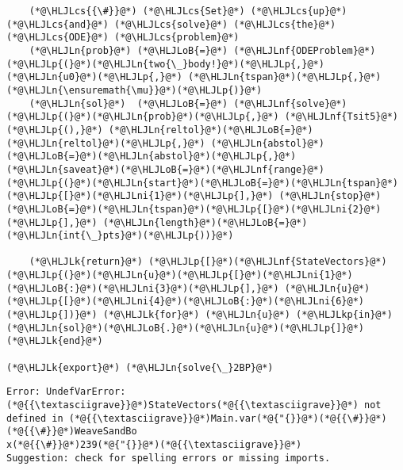 \documentclass[12pt,a4paper]{article}
\newcommand{\HLJLk}[1]{\textcolor[RGB]{148,91,176}{\textbf{#1}}}
\newcommand{\HLJLkp}[1]{\textcolor[RGB]{148,91,176}{\textbf{#1}}}
\newcommand{\HLJLn}[1]{#1}
\newcommand{\HLJLnf}[1]{\textcolor[RGB]{66,102,213}{#1}}
\newcommand{\HLJLni}[1]{\textcolor[RGB]{59,151,46}{#1}}
\newcommand{\HLJLoB}[1]{\textcolor[RGB]{102,102,102}{\textbf{#1}}}
\newcommand{\HLJLp}[1]{#1}
\newcommand{\HLJLcs}[1]{\textcolor[RGB]{153,153,119}{\textit{#1}}}
\begin{document}
\begin{lstlisting}
	(*@\HLJLcs{{\#}}@*) (*@\HLJLcs{Set}@*) (*@\HLJLcs{up}@*) (*@\HLJLcs{and}@*) (*@\HLJLcs{solve}@*) (*@\HLJLcs{the}@*) (*@\HLJLcs{ODE}@*) (*@\HLJLcs{problem}@*)
	(*@\HLJLn{prob}@*) (*@\HLJLoB{=}@*) (*@\HLJLnf{ODEProblem}@*)(*@\HLJLp{(}@*)(*@\HLJLn{two{\_}body!}@*)(*@\HLJLp{,}@*) (*@\HLJLn{u0}@*)(*@\HLJLp{,}@*) (*@\HLJLn{tspan}@*)(*@\HLJLp{,}@*) (*@\HLJLn{\ensuremath{\mu}}@*)(*@\HLJLp{)}@*)
	(*@\HLJLn{sol}@*)  (*@\HLJLoB{=}@*) (*@\HLJLnf{solve}@*)(*@\HLJLp{(}@*)(*@\HLJLn{prob}@*)(*@\HLJLp{,}@*) (*@\HLJLnf{Tsit5}@*)(*@\HLJLp{(),}@*) (*@\HLJLn{reltol}@*)(*@\HLJLoB{=}@*)(*@\HLJLn{reltol}@*)(*@\HLJLp{,}@*) (*@\HLJLn{abstol}@*)(*@\HLJLoB{=}@*)(*@\HLJLn{abstol}@*)(*@\HLJLp{,}@*) (*@\HLJLn{saveat}@*)(*@\HLJLoB{=}@*)(*@\HLJLnf{range}@*)(*@\HLJLp{(}@*)(*@\HLJLn{start}@*)(*@\HLJLoB{=}@*)(*@\HLJLn{tspan}@*)(*@\HLJLp{[}@*)(*@\HLJLni{1}@*)(*@\HLJLp{],}@*) (*@\HLJLn{stop}@*)(*@\HLJLoB{=}@*)(*@\HLJLn{tspan}@*)(*@\HLJLp{[}@*)(*@\HLJLni{2}@*)(*@\HLJLp{],}@*) (*@\HLJLn{length}@*)(*@\HLJLoB{=}@*)(*@\HLJLn{int{\_}pts}@*)(*@\HLJLp{))}@*)

	(*@\HLJLk{return}@*) (*@\HLJLp{[}@*)(*@\HLJLnf{StateVectors}@*)(*@\HLJLp{(}@*)(*@\HLJLn{u}@*)(*@\HLJLp{[}@*)(*@\HLJLni{1}@*)(*@\HLJLoB{:}@*)(*@\HLJLni{3}@*)(*@\HLJLp{],}@*) (*@\HLJLn{u}@*)(*@\HLJLp{[}@*)(*@\HLJLni{4}@*)(*@\HLJLoB{:}@*)(*@\HLJLni{6}@*)(*@\HLJLp{])}@*) (*@\HLJLk{for}@*) (*@\HLJLn{u}@*) (*@\HLJLkp{in}@*) (*@\HLJLn{sol}@*)(*@\HLJLoB{.}@*)(*@\HLJLn{u}@*)(*@\HLJLp{]}@*)
(*@\HLJLk{end}@*)

(*@\HLJLk{export}@*) (*@\HLJLn{solve{\_}2BP}@*)
\end{lstlisting}

\begin{lstlisting}
Error: UndefVarError: (*@{{\textasciigrave}}@*)StateVectors(*@{{\textasciigrave}}@*) not defined in (*@{{\textasciigrave}}@*)Main.var(*@{"{}}@*)(*@{{\#}}@*)(*@{{\#}}@*)WeaveSandBo
x(*@{{\#}}@*)239(*@{"{}}@*)(*@{{\textasciigrave}}@*)
Suggestion: check for spelling errors or missing imports.
\end{lstlisting}
\end{document}
